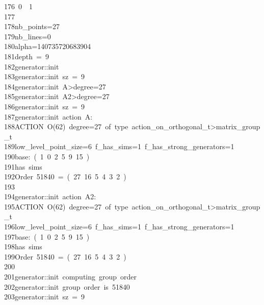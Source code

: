 \begin{tabbing}
176\>\ 0\ \ 1\ \\[0pt]
177\>\\[0pt]
178\>nb\_points=27\\[0pt]
179\>nb\_lines=0\\[0pt]
180\>alpha=140735720683904\\[0pt]
181\>depth\ =\ 9\\[0pt]
182\>generator::init\\[0pt]
183\>generator::init\ sz\ =\ 9\\[0pt]
184\>generator::init\ A>degree=27\\[0pt]
185\>generator::init\ A2>degree=27\\[0pt]
186\>generator::init\ sz\ =\ 9\\[0pt]
187\>generator::init\ action\ A:\\[0pt]
188\>ACTION\ O(62)\ degree=27\ of\ type\ action\_on\_orthogonal\_t>matrix\_group\_t\\[0pt]
189\>low\_level\_point\_size=6\ f\_has\_sims=1\ f\_has\_strong\_generators=1\\[0pt]
190\>base:\ (\ 1\ 0\ 2\ 5\ 9\ 15\ )\\[0pt]
191\>has\ sims\\[0pt]
192\>Order\ 51840\ =\ (\ 27\ 16\ 5\ 4\ 3\ 2\ )\\[0pt]
193\>\\[0pt]
194\>generator::init\ action\ A2:\\[0pt]
195\>ACTION\ O(62)\ degree=27\ of\ type\ action\_on\_orthogonal\_t>matrix\_group\_t\\[0pt]
196\>low\_level\_point\_size=6\ f\_has\_sims=1\ f\_has\_strong\_generators=1\\[0pt]
197\>base:\ (\ 1\ 0\ 2\ 5\ 9\ 15\ )\\[0pt]
198\>has\ sims\\[0pt]
199\>Order\ 51840\ =\ (\ 27\ 16\ 5\ 4\ 3\ 2\ )\\[0pt]
200\>\\[0pt]
201\>generator::init\ computing\ group\ order\\[0pt]
202\>generator::init\ group\ order\ is\ 51840\\[0pt]
203\>generator::init\ sz\ =\ 9\\[0pt]

\end{tabbing}
